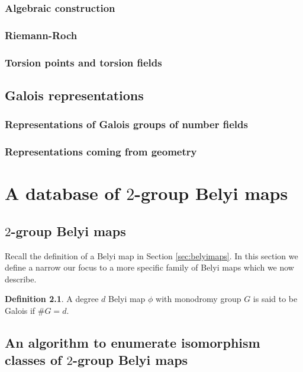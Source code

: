 \documentclass{dcthesis}
\newcommand{\defi}[1]{\textsf{#1}}
\theoremstyle{definition}
\newtheorem{definition}[prop]{Definition}
\theoremstyle{remark}
\begin{document}
{{    \subsection{Algebraic construction}{
      \lipsum[1]
    }
    \subsection{Riemann-Roch}{
      \lipsum[1]
    }
    \subsection{Torsion points and torsion fields}{
      \lipsum[1]
    }
  }
  \section{Galois representations}{
    \lipsum[1]
    \subsection{Representations of Galois groups of number fields}{
      \lipsum[1]
    }
    \subsection{Representations coming from geometry}{
      \lipsum[1]
    }
  }
}
\chapter{A database of $2$-group Belyi maps}{\label{chapter:database}
  \section{$2$-group Belyi maps}{\label{sec:defs}
    Recall the definition of a Belyi map in Section \ref{sec:belyimaps}.
    In this section we define a narrow our focus to a more specific family of Belyi maps
    which we now describe.
    \begin{definition}
      A degree $d$ Belyi map $\phi$ with monodromy group $G$
      is said to be \defi{Galois} if $\#G = d$.
    \end{definition}
  }
  \section{An algorithm to enumerate isomorphism classes of $2$-group Belyi maps}{
  }
}

\backmatter




\end{document}
